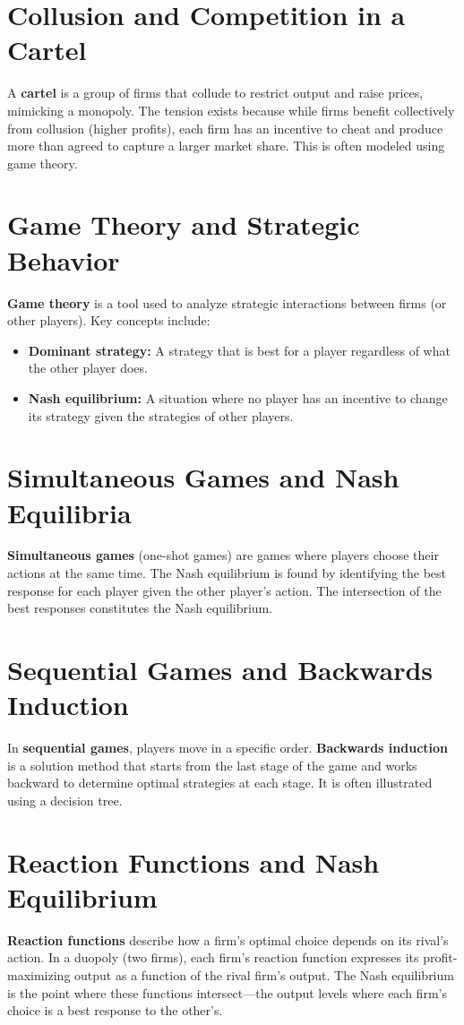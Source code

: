 \section*{Collusion and Competition in a Cartel}
A \textbf{cartel} is a group of firms that collude to restrict output and raise prices, mimicking a monopoly. The tension exists because while firms benefit collectively from collusion (higher profits), each firm has an incentive to cheat and produce more than agreed to capture a larger market share. This is often modeled using game theory.

\section*{Game Theory and Strategic Behavior}
\textbf{Game theory} is a tool used to analyze strategic interactions between firms (or other players). Key concepts include:
\begin{itemize}
    \item \textbf{Dominant strategy:} A strategy that is best for a player regardless of what the other player does.
    \item \textbf{Nash equilibrium:} A situation where no player has an incentive to change its strategy given the strategies of other players.
\end{itemize}

\section*{Simultaneous Games and Nash Equilibria}
\textbf{Simultaneous games} (one-shot games) are games where players choose their actions at the same time. The Nash equilibrium is found by identifying the best response for each player given the other player's action. The intersection of the best responses constitutes the Nash equilibrium.

\section*{Sequential Games and Backwards Induction}
In \textbf{sequential games}, players move in a specific order. \textbf{Backwards induction} is a solution method that starts from the last stage of the game and works backward to determine optimal strategies at each stage. It is often illustrated using a decision tree.

\section*{Reaction Functions and Nash Equilibrium}
\textbf{Reaction functions} describe how a firm's optimal choice depends on its rival's action. In a duopoly (two firms), each firm's reaction function expresses its profit-maximizing output as a function of the rival firm's output. The Nash equilibrium is the point where these functions intersect—the output levels where each firm's choice is a best response to the other's.

